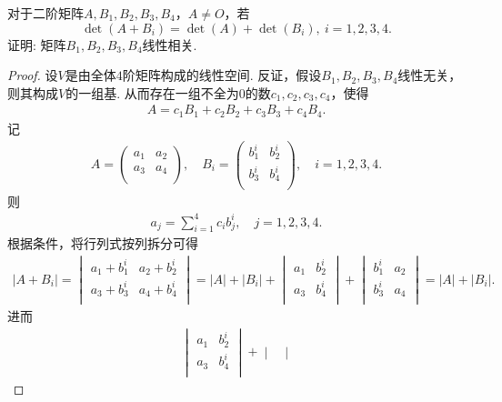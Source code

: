 \documentclass[../../main.tex]{subfiles}%
\begin{document}
\begin{example}
对于二阶矩阵$A,B_1,B_2,B_3,B_4$，$A \neq O$，若
$$\det(A + B_i) = \det(A) + \det(B_i),\ i = 1,2,3,4.$$
证明: 矩阵$B_1,B_2,B_3,B_4$线性相关.
\end{example}
\begin{proof}
设$V$是由全体$4$阶矩阵构成的线性空间. 反证，假设$B_1,B_2,B_3,B_4$线性无关，则其构成$V$的一组基. 从而存在一组不全为$0$的数$c_1,c_2,c_3,c_4$，使得
\begin{align*}
A=c_1B_1+c_2B_2+c_3B_3+c_4B_4.
\end{align*}
记
\begin{align*}
A=\begin{pmatrix}
a_1&		a_2\\
a_3&		a_4\\
\end{pmatrix},\quad B_i=\begin{pmatrix}
b_{1}^{i}&		b_{2}^{i}\\
b_{3}^{i}&		b_{4}^{i}\\
\end{pmatrix},\quad i=1,2,3,4.
\end{align*}
则
\begin{align*}
a_j=\sum_{i=1}^4{c_ib_{j}^{i}},\quad j=1,2,3,4.
\end{align*}
根据条件，将行列式按列拆分可得
\begin{align*}
\left| A+B_i \right|=\begin{vmatrix}
a_1+b_{1}^{i}&		a_2+b_{2}^{i}\\
a_3+b_{3}^{i}&		a_4+b_{4}^{i}\\
\end{vmatrix}=\left| A \right|+\left| B_i \right|+\begin{vmatrix}
a_1&		b_{2}^{i}\\
a_3&		b_{4}^{i}\\
\end{vmatrix}+\begin{vmatrix}
b_{1}^{i}&		a_2\\
b_{3}^{i}&		a_4\\
\end{vmatrix}=\left| A \right|+\left| B_i \right|.
\end{align*}
进而
\begin{align*}
\begin{vmatrix}
a_1&		b_{2}^{i}\\
a_3&		b_{4}^{i}\\
\end{vmatrix}+\begin{vmatrix}

\end{vmatrix}
\end{align*}
\end{proof}
\end{document}
